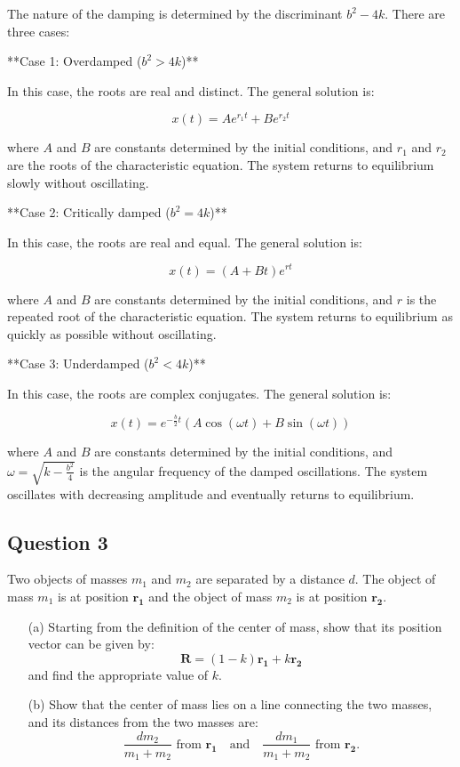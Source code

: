 \documentclass{article}
\begin{document}
The nature of the damping is determined by the discriminant $b^2 - 4k$. There are three cases:

**Case 1: Overdamped ($b^2 > 4k$)**

In this case, the roots are real and distinct. The general solution is:

\begin{equation*}
x(t) = Ae^{r_1t} + Be^{r_2t}
\end{equation*}

where $A$ and $B$ are constants determined by the initial conditions, and $r_1$ and $r_2$ are the roots of the characteristic equation. The system returns to equilibrium slowly without oscillating.

**Case 2: Critically damped ($b^2 = 4k$)**

In this case, the roots are real and equal. The general solution is:

\begin{equation*}
x(t) = (A + Bt)e^{rt}
\end{equation*}

where $A$ and $B$ are constants determined by the initial conditions, and $r$ is the repeated root of the characteristic equation. The system returns to equilibrium as quickly as possible without oscillating.

**Case 3: Underdamped ($b^2 < 4k$)**

In this case, the roots are complex conjugates. The general solution is:

\begin{equation*}
x(t) = e^{-\frac{b}{2}t}(A\cos(\omega t) + B\sin(\omega t))
\end{equation*}

where $A$ and $B$ are constants determined by the initial conditions, and $\omega = \sqrt{k - \frac{b^2}{4}}$ is the angular frequency of the damped oscillations. The system oscillates with decreasing amplitude and eventually returns to equilibrium.

\subsection{Question 3}
Two objects of masses $m_1$ and $m_2$ are separated by a distance $d$. The object of mass $m_1$ is at position $\mathbf{r_1}$ and the object of mass $m_2$ is at position $\mathbf{r_2}$.

\begin{itemize}
    \item[(a)] Starting from the definition of the center of mass, show that its position vector can be given by:
    \[
    \mathbf{R} = (1 - k)\mathbf{r_1} + k\mathbf{r_2}
    \]
    and find the appropriate value of $k$.
    
    \item[(b)] Show that the center of mass lies on a line connecting the two masses, and its distances from the two masses are:
    \[
    \frac{dm_2}{m_1 + m_2} \text{ from } \mathbf{r_1} \quad \text{and} \quad \frac{dm_1}{m_1 + m_2} \text{ from } \mathbf{r_2}.
    \]
\end{itemize}
\end{document}
